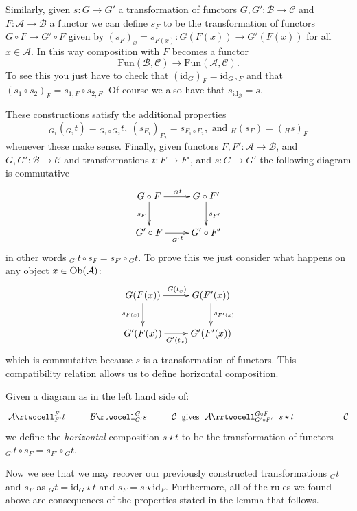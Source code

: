 \medskip\noindent
Similarly, given $s : G \to G'$ a transformation of
functors $G, G' : \mathcal{B} \to \mathcal{C}$ and
$F : \mathcal{A} \to \mathcal{B}$ a functor we can define
$s_F$ to be the transformation of functors
$G\circ F \to G' \circ F$ given by
$(s_F)_x = s_{F(x)} : G(F(x)) \to G'(F(x))$
for all $x \in \mathcal{A}$. In this way
composition with $F$ becomes a functor
$$
\text{Fun}(\mathcal{B}, \mathcal{C})
\longrightarrow
\text{Fun}(\mathcal{A}, \mathcal{C}).
$$
To see this you just have to check that
$(\text{id}_G)_F = \text{id}_{G\circ F}$ and that
$(s_1 \circ s_2)_F = s_{1, F} \circ s_{2, F}$.
Of course we also have that $s_{\text{id}_\mathcal{B}} = s$.

\medskip\noindent
These constructions satisfy the additional properties
$$
{}_{G_1}({}_{G_2}t) = {}_{G_1\circ G_2}t,
\ (s_{F_1})_{F_2} = s_{F_1 \circ F_2},
\text{ and }{}_H(s_F) = ({}_Hs)_F
$$
whenever these make sense.
Finally, given functors $F, F' : \mathcal{A} \to \mathcal{B}$,
and $G, G' : \mathcal{B} \to \mathcal{C}$ and transformations
$t : F \to F'$, and $s : G \to G'$ the following
diagram is commutative
$$
\xymatrix{
G \circ F \ar[r]^{{}_Gt} \ar[d]_{s_F}
&
G \circ F' \ar[d]^{s_{F'}} \\
G' \circ F \ar[r]_{{}_{G'}t}
&
G' \circ F'
}
$$
in other words ${}_{G'}t \circ s_F = s_{F'}\circ {}_Gt$.
To prove this we just consider what happens on
any object $x \in \mathop{\mathrm{Ob}}\nolimits(\mathcal{A})$:
$$
\xymatrix{
G(F(x)) \ar[r]^{G(t_x)} \ar[d]_{s_{F(x)}}
&
G(F'(x)) \ar[d]^{s_{F'(x)}} \\
G'(F(x)) \ar[r]_{G'(t_x)}
&
G'(F'(x))
}
$$
which is commutative because $s$ is a transformation
of functors. This compatibility relation allows us
to define horizontal composition.

\begin{definition}
\label{definition-horizontal-composition}
Given a diagram as in the left hand side of:
$$
\xymatrix{
\mathcal{A}
\rtwocell^F_{F'}{t}
&
\mathcal{B}
\rtwocell^G_{G'}{s}
&
\mathcal{C}
}
\text{ gives }
\xymatrix{
\mathcal{A}
\rrtwocell^{G \circ F} _{G' \circ F'}{\ \ s \star t}
& &
\mathcal{C}
}
$$
we define the {\it horizontal} composition $s \star t$ to be the
transformation of functors ${}_{G'}t \circ s_F = s_{F'}\circ {}_Gt$.
\end{definition}

\noindent
Now we see that we may recover our previously constructed
transformations ${}_Gt$ and $s_F$ as
$ {}_Gt = \text{id}_G \star t $ and $ s_F = s \star \text{id}_F $.
Furthermore, all of the rules we found above are consequences of
the properties stated in the lemma that follows.

